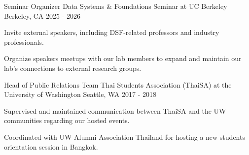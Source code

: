 

\begin{cventries}

  \cventry
    {Seminar Organizer} %
    {Data Systems \& Foundations Seminar at UC Berkeley} %
    {Berkeley, CA} %
    {2025 - 2026} %
    {
      \begin{cvitems} %
        \item {Invite external speakers, including DSF-related professors and industry professionals.}
        \item {Organize speakers meetups with our lab members to expand and maintain our lab's connections to external research groups.}
      \end{cvitems}
    }

  \cventry
    {Head of Public Relations Team} %
    {Thai Students Association (ThaiSA) at the University of Washington} %
    {Seattle, WA} %
    {2017 - 2018} %
    {
      \begin{cvitems} %
        \item {Supervised and maintained communication between ThaiSA and the UW communities regarding our hosted events.}
        \item {Coordinated with UW Alumni Association Thailand for hosting a new students orientation session in Bangkok.}
      \end{cvitems}
    }

\end{cventries}
